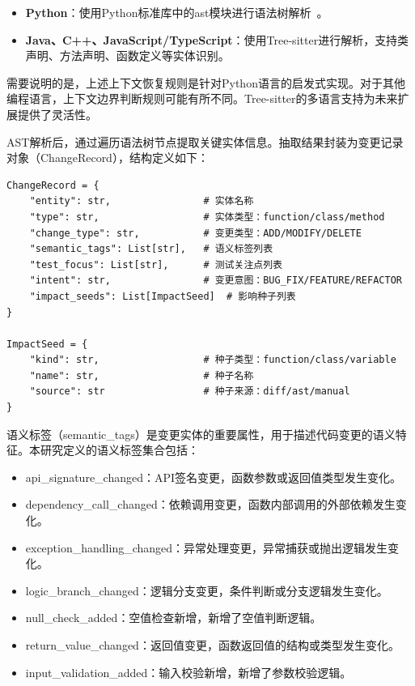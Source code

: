 \begin{itemize}
    \item \textbf{Python}：使用Python标准库中的\textsf{ast}模块进行语法树解析~\cite{PythonAST}。
    \item \textbf{Java、C++、JavaScript/TypeScript}：使用Tree-sitter进行解析，支持类声明、方法声明、函数定义等实体识别。
\end{itemize}

需要说明的是，上述上下文恢复规则是针对Python语言的启发式实现。对于其他编程语言，上下文边界判断规则可能有所不同。Tree-sitter的多语言支持为未来扩展提供了灵活性。

AST解析后，通过遍历语法树节点提取关键实体信息。抽取结果封装为变更记录对象（ChangeRecord），结构定义如下：

\begin{lstlisting}
ChangeRecord = {
    "entity": str,                # 实体名称
    "type": str,                  # 实体类型：function/class/method
    "change_type": str,           # 变更类型：ADD/MODIFY/DELETE
    "semantic_tags": List[str],   # 语义标签列表
    "test_focus": List[str],      # 测试关注点列表
    "intent": str,                # 变更意图：BUG_FIX/FEATURE/REFACTOR
    "impact_seeds": List[ImpactSeed]  # 影响种子列表
}

ImpactSeed = {
    "kind": str,                  # 种子类型：function/class/variable
    "name": str,                  # 种子名称
    "source": str                 # 种子来源：diff/ast/manual
}
\end{lstlisting}

语义标签（semantic\_tags）是变更实体的重要属性，用于描述代码变更的语义特征。本研究定义的语义标签集合包括：

\begin{itemize}
    \item \textsf{api\_signature\_changed}：API签名变更，函数参数或返回值类型发生变化。
    \item \textsf{dependency\_call\_changed}：依赖调用变更，函数内部调用的外部依赖发生变化。
    \item \textsf{exception\_handling\_changed}：异常处理变更，异常捕获或抛出逻辑发生变化。
    \item \textsf{logic\_branch\_changed}：逻辑分支变更，条件判断或分支逻辑发生变化。
    \item \textsf{null\_check\_added}：空值检查新增，新增了空值判断逻辑。
    \item \textsf{return\_value\_changed}：返回值变更，函数返回值的结构或类型发生变化。
    \item \textsf{input\_validation\_added}：输入校验新增，新增了参数校验逻辑。
\end{itemize}

